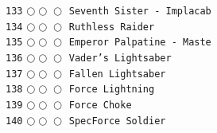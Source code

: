 \documentclass[a4paper,landscape]{article}
\begin{document}
\begin{multicols*}{5}
\texttt{133} \(\bigcirc\!\bigcirc\!\bigcirc\)  \texttt{Seventh Sister - Implacab} \vspace{-0.3mm}\\ 
\texttt{134} \(\bigcirc\!\bigcirc\!\bigcirc\)  \texttt{Ruthless Raider} \vspace{-0.3mm}\\ 
\texttt{135} \(\bigcirc\!\bigcirc\!\bigcirc\)  \texttt{Emperor Palpatine - Maste} \vspace{-0.3mm}\\ 
\texttt{136} \(\bigcirc\!\bigcirc\!\bigcirc\)  \texttt{Vader's Lightsaber} \vspace{-0.3mm}\\ 
\texttt{137} \(\bigcirc\!\bigcirc\!\bigcirc\)  \texttt{Fallen Lightsaber} \vspace{-0.3mm}\\ 
\texttt{138} \(\bigcirc\!\bigcirc\!\bigcirc\)  \texttt{Force Lightning} \vspace{-0.3mm}\\ 
\texttt{139} \(\bigcirc\!\bigcirc\!\bigcirc\)  \texttt{Force Choke} \vspace{-0.3mm}\\ 
\texttt{140} \(\bigcirc\!\bigcirc\!\bigcirc\)  \texttt{SpecForce Soldier} \vspace{-0.3mm}\\ 

\end{multicols*}
\end{document}
